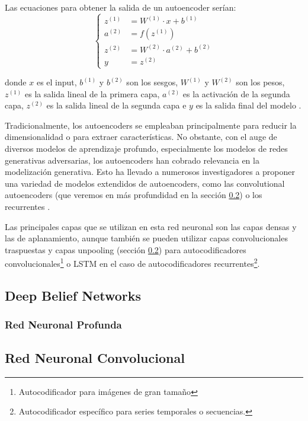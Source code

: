 Las ecuaciones para obtener la salida de un autoencoder serían:
\[
\left\{
\begin{aligned}
z^{(1)} &= W^{(1)} \cdot x + b^{(1)} \\
a^{(2)} &= f(z^{(1)})  \\
z^{(2)} &= W^{(2)} \cdot a^{(2)} + b^{(2)}  \\
y &= z^{(2)} 
\end{aligned}
\right.
\]

donde  $x$ es el input, \( b^{(1)} \) y  \( b^{(2)} \) son los sesgos,  \( W^{(1)} \) y  \( W^{(2)} \) son los pesos, \( z^{(1)} \) es la salida lineal de la primera capa, \( a^{(2)} \) es la activación de la segunda capa, \( z^{(2)} \) es la salida lineal de la segunda capa e \( y \) es la salida final del modelo \citep{martinez2017analisis}.


Tradicionalmente, los autoencoders se empleaban principalmente para reducir la dimensionalidad o para extraer características. No obstante, con el auge de diversos modelos de aprendizaje profundo, especialmente los modelos de redes generativas adversarias, los autoencoders han cobrado relevancia en la modelización generativa. Esto ha llevado a numerosos investigadores a proponer una variedad de modelos extendidos de autoencoders, como las convolutional autoencoders (que veremos en más profundidad en la sección \ref{sec:2.CNN}) o los recurrentes \citep{zhai2018autoencoder}. 

Las principales capas que se utilizan en esta red neuronal son las capas densas y las de aplanamiento, aunque también se pueden utilizar capas convolucionales traspuestas y capas unpooling (sección \ref{sec:2.CNN}) para autocodificadores convolucionales\footnote{Autocodificador para imágenes de gran tamaño} o LSTM en el caso de autocodificadores recurrentes\footnote{Autocodificador específico para series temporales o secuencias.}\citep{geron2022hands}. 




\subsection{Deep Belief Networks}
\subsubsection{Red Neuronal Profunda}
\subsection{Red Neuronal Convolucional} \label{sec:2.CNN}


